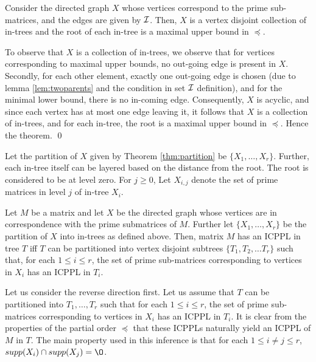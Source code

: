 \documentclass{fsttcs}
\def\cI{{\cal I}}
\begin{document}
\begin{theorem} \label{thm:partition} Consider the directed graph $X$
  whose vertices correspond to the prime sub-matrices, and the edges
  are given by $\cI$.  Then, $X$ is a vertex disjoint collection of
  in-trees and the root of each in-tree is a maximal upper bound in
  $\preccurlyeq$.
\end{theorem}
\proof
To observe that $X$ is a collection of in-trees, we observe that for         
vertices corresponding to maximal upper bounds, no out-going edge is
present in $X$.  Secondly, for each other element, exactly one
out-going edge is chosen (due to lemma \ref{lem:twoparents} and the
condition in set $\cI$ definition), and for the 
minimal lower bound, there is no in-coming edge.  Consequently, $X$ is
acyclic, and since each vertex has at most one edge leaving it, it
follows that $X$ is a collection of in-trees, and for each in-tree,
the root is a maximal upper bound in $\preccurlyeq$.  Hence the
theorem. 
\qed

\noindent
Let the partition of $X$ given by Theorem \ref{thm:partition} be
$\{X_1,\ldots,X_r\}$.  Further, each in-tree itself  
can be layered based on the distance from the root.  The root is
considered to be at level zero. For $j \geq 0$, Let $X_{i,j}$ denote
the set of prime matrices in level $j$ of in-tree $X_i$.   

\begin{lemma}
\label{lem:subicppa}
Let $M$ be a matrix and let $X$ be the directed graph whose vertices
are in correspondence with the prime submatrices of $M$.  Further let
$\{X_1,\ldots,X_r\}$ be the partition of $X$ into in-trees as defined
above. 
Then, matrix $M$ has an ICPPL in tree $T$ iff $T$ can be partitioned
into vertex disjoint subtrees 
 $\{T_1, T_2, \dots T_r\}$ such that, for each $1 \leq i \leq r$, the
 set of prime sub-matrices corresponding to vertices in $X_i$ has an
 ICPPL in $T_i$. 
\end{lemma}
\proof
Let us consider the reverse direction first.  Let us assume that $T$
can be partitioned into $T_1, \ldots, T_r$ such 
that for each $1 \leq i \leq r $, the set of prime sub-matrices
corresponding to vertices in $X_i$ has an ICPPL in $T_i$.  It is clear
from the properties of the partial order $\preccurlyeq$ that these
ICPPLs naturally yield an ICPPL  of $M$ in $T$.  The main property
used in this inference is that for each $1 \leq i \neq j \leq r$,
$supp(X_i) \cap supp(X_j) = \O$.   
\end{document}
